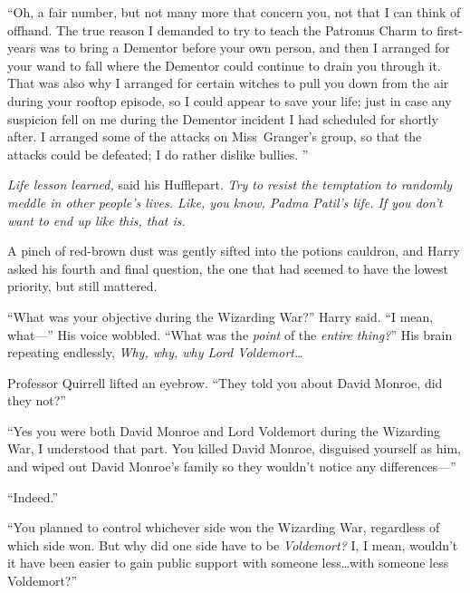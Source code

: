 “Oh, a fair number, but not many more that concern you, not that I can think of
offhand. The true reason I demanded to try to teach the Patronus Charm to
first-years was to bring a Dementor before your own person, and then I arranged
for your wand to fall where the Dementor could continue to drain you through
it.  That was also why I arranged for certain witches to pull
you down from the air during your rooftop episode, so I could appear to save
your life; just in case any suspicion fell on me during the Dementor incident I
had scheduled for shortly after.  I arranged some
of the attacks on Miss~Granger’s group, so that the attacks could be defeated;
I do rather dislike bullies. ”

\emph{Life lesson learned,} said his Hufflepart. \emph{Try to resist the
temptation to randomly meddle in other people’s lives. Like, you know, Padma
Patil’s life. If you don’t want to end up like this, that is.}

A pinch of red-brown dust was gently sifted into the potions cauldron, and
Harry asked his fourth and final question, the one that had seemed to have the
lowest priority, but still mattered.

“What was your objective during the Wizarding War?” Harry said. “I mean,
what—” His voice wobbled. “What was the \emph{point} of the \emph{entire
thing?}” His brain repeating endlessly, \emph{Why, why, why Lord
Voldemort…}

Professor Quirrell lifted an eyebrow. “They told you about David Monroe, did
they not?”

“Yes you were both David Monroe and Lord Voldemort during the Wizarding War, I
understood that part. You killed David Monroe, disguised yourself as him, and
wiped out David Monroe’s family so they wouldn’t notice any differences—”

“Indeed.”

“You planned to control whichever side won the Wizarding War, regardless of
which side won. But why did one side have to be \emph{Voldemort?} I, I mean,
wouldn’t it have been easier to gain public support with someone less…with
someone less Voldemort?”

